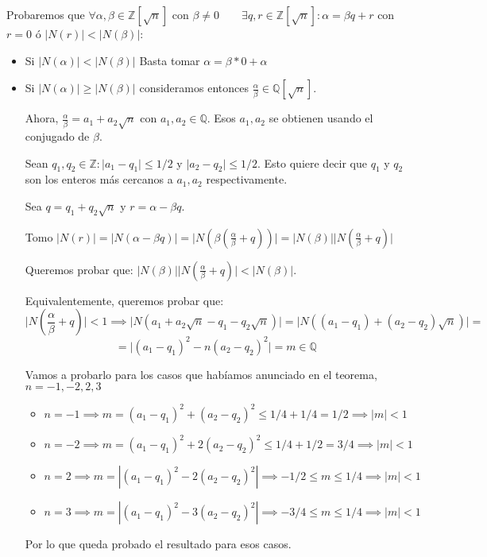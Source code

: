 \documentclass[11pt, a4paper, titlepage]{article}
\makeatletter
\newif\IfInSansMode
\let\oldsf\sffamily
\renewcommand*{\sffamily}{\oldsf\mathversion{sans}\InSansModetrue}
\let\oldnorm\normalfont
\renewcommand*{\normalfont}{\oldnorm\InSansModefalse\mathversion{normal}}
\renewenvironment{proof}[1][\proofname] {\vspace{-15pt}\par\pushQED{\qed}\normalfont\topsep6\p@\@plus6\p@\relax\trivlist\item[\hskip\labelsep\it#1\@addpunct{.}]\ignorespaces}{\popQED\endtrivlist\@endpefalse}
\providecommand{\ent}{\mathbb{Z}}
\providecommand{\rac}{\mathbb{Q}}
\providecommand{\abs}[1]{\lvert#1\rvert}
\renewenvironment{proof}[1][\proofname] {\par\pushQED{\qed}\normalfont\topsep6\p@\@plus6\p@\relax\trivlist\item[\hskip\labelsep\itshape\sffamily#1\@addpunct{.}]\ignorespaces}{\popQED\endtrivlist\@endpefalse}
\theoremstyle{theorem-style}
\theoremstyle{definition-style}
\theoremstyle{remark-style}
\theoremstyle{example-style}
\makeatother
\begin{document}
\begin{proof}
	Probaremos que $\forall \alpha, \beta \in \ent[\sqrt{n}]$ con $\beta \neq 0 \quad \quad \exists q,r \in \ent[\sqrt{n}] : \alpha = \beta q + r$ con $r=0$ ó $\abs{N(r)} < \abs{N(\beta)}$:

	\begin{itemize}
	\item Si $\abs{N(\alpha)} < \abs{N(\beta)}$ Basta tomar $\alpha  =  \beta * 0 + \alpha$

	\item Si $\abs{N(\alpha)} \geq \abs{N(\beta)}$ consideramos entonces  $\frac{\alpha}{\beta} \in \rac[\sqrt{n}]$.

	Ahora, $\frac{\alpha}{\beta} = a_1 + a_2\sqrt{n}$ con $a_1, a_2 \in \rac $. Esos $a_1,a_2$ se obtienen usando el conjugado de $\beta$.

	Sean $q_1,q_2 \in \ent : \abs{a_1-q_1}\leq 1/2$ y $\abs{a_2-q_2}\leq 1/2$. Esto quiere decir que $q_1$ y $q_2$ son los enteros más cercanos a $a_1,a_2$ respectivamente.

	Sea $q=q_1+q_2\sqrt{n}$  y $r = \alpha - \beta q$.

	Tomo $\abs{N(r)} = \abs{N(\alpha - \beta q)} = \abs{N(\beta(\frac{\alpha}{\beta}+ q))} = \abs{N(\beta)}\abs{N(\frac{\alpha}{\beta}+ q)}$

	Queremos probar que: $\abs{N(\beta)}\abs{N(\frac{\alpha}{\beta}+ q)} < \abs{N(\beta)}$.

	Equivalentemente, queremos probar que:
	\[
	  \abs{N(\frac{\alpha}{\beta}+ q)} < 1 \implies \abs{N(a_1+a_2\sqrt{n}-q_1 -q_2\sqrt{n})} = \abs{N((a_1-q_1) + (a_2-q_2)\sqrt{n})} = \]
	  \[
	 = \abs{(a_1-q_1)^2 - n(a_2-q_2)^2} = m \in \rac
	 \]

Vamos a probarlo para los casos que habíamos anunciado en el teorema, $n = -1,-2,2,3$

\begin{itemize}
	\item $n=-1 \implies m= (a_1-q_1)^2 +(a_2-q_2)^2 \leq 1/4 + 1/4 = 1/2 \implies \abs{m} < 1$

	\item $n=-2 \implies m = (a_1-q_1)^2 +2(a_2-q_2)^2 \leq 1/4 + 1/2 = 3/4 \implies \abs{m} < 1$

	\item $n=2 \implies m = |(a_1-q_1)^2 -2(a_2-q_2)^2 |\implies -1/2 \leq m \leq 1/4 \implies \abs{m} < 1$

	\item $n=3 \implies m = |(a_1-q_1)^2 -3(a_2-q_2)^2| \implies -3/4 \leq m \leq 1/4 \implies \abs{m} < 1$
\end{itemize}

Por lo que queda probado el resultado para esos casos.

\end{itemize}
\end{proof}
\end{document}
